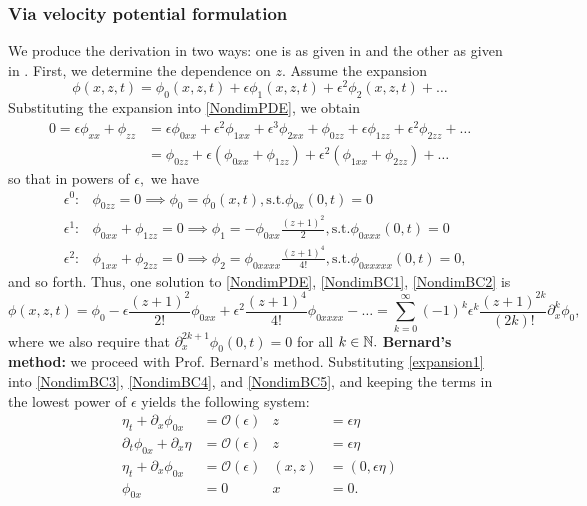 \documentclass[10pt,reqno,oneside,a4paper]{article}
\begin{document}
\subsubsection{Via velocity potential formulation}
We produce the derivation in two ways: one is as given in \cite{bernard} and the other as given in \cite{ablowitz}. First, we determine the dependence on $z.$ Assume the expansion 
\[
\phi(x,z,t) = \phi_0(x,z,t) + \epsilon \phi_1(x,z,t) + \epsilon^2 \phi_2(x,z,t) + \ldots
\]
Substituting the expansion into \eqref{NondimPDE}, we obtain
\begin{align*}
0 = \epsilon\phi_{xx} + \phi_{zz} &= \epsilon\phi_{0xx} + \epsilon^2 \phi_{1xx}+ \epsilon^3 \phi_{2xx} + \phi_{0zz} + \epsilon \phi_{1zz}+ \epsilon^2 \phi_{2zz} + \ldots \\
&= \phi_{0zz} + \epsilon(\phi_{0xx} + \phi_{1zz}) + \epsilon^2(\phi_{1xx}+\phi_{2zz}) + \ldots
\end{align*}
so that in powers of $\epsilon,$ we have
\begin{align*}
&\epsilon^0: &\phi_{0zz} = 0 \implies \phi_0 = \phi_0(x,t), \mbox{s.t.} \phi_{0x}(0,t) = 0 \\
&\epsilon^1: &\phi_{0xx} + \phi_{1zz} = 0 \implies \phi_1 = - \phi_{0xx} \frac{(z+1)^2}{2},  \mbox{s.t.} \phi_{0xxx}(0,t) = 0 \\
&\epsilon^2: &\phi_{1xx}+\phi_{2zz} = 0 \implies \phi_2 = \phi_{0xxxx} \frac{(z+1)^4}{4!},  \mbox{s.t.} \phi_{0xxxxx}(0,t) = 0,
\end{align*}
and so forth. Thus, one solution to \eqref{NondimPDE}, \eqref{NondimBC1}, \eqref{NondimBC2} is 
\begin{equation}\label{expansion1}
\phi(x,z,t) = \phi_0 - \epsilon\frac{(z+1)^2}{2!}\phi_{0xx} + \epsilon^2 \frac{(z+1)^4}{4!}\phi_{0xxxx} - \ldots = \sum^{\infty}_{k=0} (-1)^k \epsilon^k \frac{(z+1)^{2k}}{(2k)!} \partial^k_x \phi_0,
\end{equation}
where we also require that $\partial_x^{2k+1}\phi_0(0,t) = 0$ for all $k \in \mathbb N.$ 
\vspace{1cm}
\newline \textbf{Bernard's method:} we proceed with Prof. Bernard's method. Substituting \eqref{expansion1} into \eqref{NondimBC3}, \eqref{NondimBC4}, and \eqref{NondimBC5}, and keeping the terms in the lowest power of $\epsilon$ yields the following system:
\begin{subequations} \label{NonDimHalfLineProb1}
\begin{align}
\label{P1BC1}\eta_t + \partial_x\phi_{0x} &= \mathcal{O}(\epsilon) &z &= \epsilon\eta \\
\label{P1BC2}\partial_t\phi_{0x} + \partial_x \eta &=  \mathcal{O}(\epsilon) &z &= \epsilon\eta  \\
\label{P1BC3}\eta_t + \partial_x\phi_{0x} &= \mathcal{O}(\epsilon) &(x,z) &= (0,\epsilon\eta) \\
\label{P1BC4}\phi_{0x} &= 0 &x &= 0.
\end{align}
\end{subequations}
\end{document}
